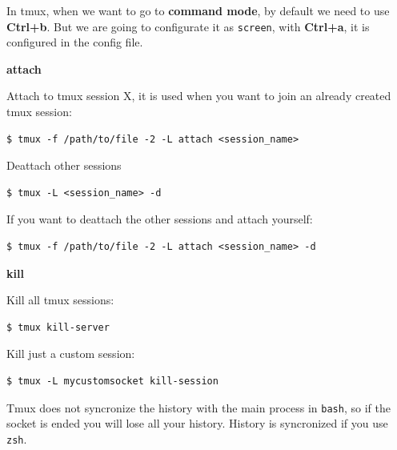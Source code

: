 \documentclass{article}
\newenvironment{blocktemplateIII}[1]{%
    \tcolorbox[beamer,%
    noparskip,breakable,
    ,colframe=Red,%
    colbacklower=LimeGreen!75!LightGreen,%
    title=#1]}%
    {\endtcolorbox}
\newenvironment{codetemplate}[1][]{%
  \mybasecolorbox[#1]
  \itshape
}{%
  \endmybasecolorbox
}
\begin{document}
In tmux, when we want to go to \textbf{command mode}, by default we need to use \textbf{Ctrl+b}. But we are going to configurate it as \verb|screen|, with \textbf{Ctrl+a}, it is configured in the config file.


\textbf{attach}

Attach to tmux session X, it is used when you want to join an already created tmux session:

\begin{codetemplate}
\begin{verbatim}
$ tmux -f /path/to/file -2 -L attach <session_name>
\end{verbatim}
\end{codetemplate}

Deattach other sessions
\begin{codetemplate}
\begin{verbatim}
$ tmux -L <session_name> -d
\end{verbatim}
\end{codetemplate}

If you want to deattach the other sessions and attach yourself:
\begin{codetemplate}
\begin{verbatim}
$ tmux -f /path/to/file -2 -L attach <session_name> -d
\end{verbatim}
\end{codetemplate}

\textbf{kill}

Kill all tmux sessions:
\begin{codetemplate}
\begin{verbatim}
$ tmux kill-server
\end{verbatim}
\end{codetemplate}

Kill just a custom session:
\begin{codetemplate}
\begin{verbatim}
$ tmux -L mycustomsocket kill-session
\end{verbatim}
\end{codetemplate}

\begin{blocktemplateIII}{Warning}
Tmux does not syncronize the history with the main process in \verb|bash|, so if the socket is ended you will lose all your history. History is syncronized if you use \verb|zsh|.
\end{blocktemplateIII}
\end{document}
